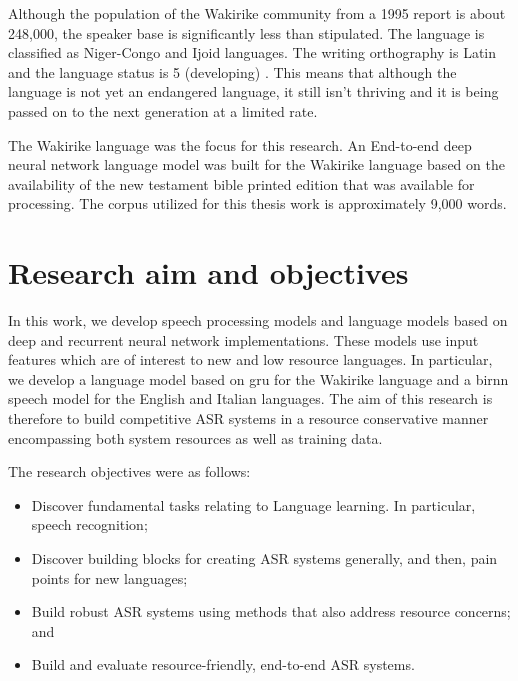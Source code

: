 Although the population of the Wakirike community from a 1995 report \citep{ethnologue} is about 248,000, the speaker base is  significantly less than stipulated.  The language is classified as Niger-Congo and Ijoid languages.  The writing orthography is Latin and the language status is 5 (developing) \citep{ethnologue}.  This means that although the language is not yet an endangered language, it still isn't thriving and it is being passed on to the next generation at a limited rate.

The Wakirike language was the focus for this research.  An End-to-end deep neural network language model was built for the Wakirike language based on the availability of the new testament bible printed edition that was available for processing.  The corpus utilized for this thesis work is approximately 9,000 words.

\section{Research aim and objectives}
\startblue
In this work, we develop speech processing models and language models based on deep and recurrent neural network implementations. These models use input features which are of interest to new and low resource languages.  In particular, we develop a language model based on \acrfull{gru} for the Wakirike language and a \acrfull{birnn} speech model for the English and Italian languages.  The aim of this research is therefore to build competitive ASR systems in a resource conservative manner encompassing both system resources as well as training data.

The research objectives were as follows:
\begin{itemize}
    \item Discover fundamental tasks relating to Language learning.  In particular, speech recognition;
    \item Discover building blocks for creating ASR systems generally, and then, pain points for new languages;
    \item Build robust ASR systems using methods that also address resource concerns; and
    \item Build and evaluate resource-friendly, end-to-end ASR systems.
\end{itemize}\stopblue


